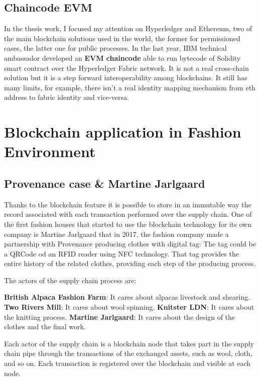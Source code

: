 \subsection{Chaincode EVM}

In the thesis work, I focused my attention on Hyperledger and Ethereum, two of the main blockchain 
solutions used in the world, the former for permissioned cases, the latter one for public processes. 
In the last year, IBM technical ambassador developed an \textbf{EVM chaincode}\cite{evm-chaincode} 
able to run bytecode of Solidity smart contract over the Hyperledger Fabric network. It is not a real 
cross-chain solution but it is a step forward interoperability among blockchains. It still has many limits, 
for example, there isn't a real identity mapping mechanism from eth address to fabric identity and vice-versa. 

\section{Blockchain application in Fashion Environment}

\subsection{Provenance case & Martine Jarlgaard}

Thanks to the blockchain feature it is possible to store in an immutable way the record associated with each 
transaction performed over the supply chain.  One of the first fashion houses that started to use the blockchain 
technology for its own company is Martine Jarlgaard that in 2017, the fashion company made a partnership with Provenance\cite{provenance} 
producing clothes with digital tag: The tag could be a QRCode od an RFID reader using NFC technology.
That tag provides the entire history of the related clothes, providing each step of the producing process.
\bigskip

The actors of the supply chain process are:

\begin{outline}
    \1 \textbf{British Alpaca Fashion Farm}: It cares about alpacas livestock and shearing.
    \1 \textbf{Two Rivers Mill}: It cares about wool spinning.
    \1 \textbf{Knitster LDN}: It cares about the knitting process.
    \1 \textbf{Martine Jarlgaard}: It cares about the design of the clothes and the final work.
\end{outline}

Each actor of the supply chain is a blockchain node that takes part in the supply chain pipe through 
the transactions of the exchanged assets, such as wool, cloth, and so on. Each transaction is registered over the 
blockchain and visible at each node. 

